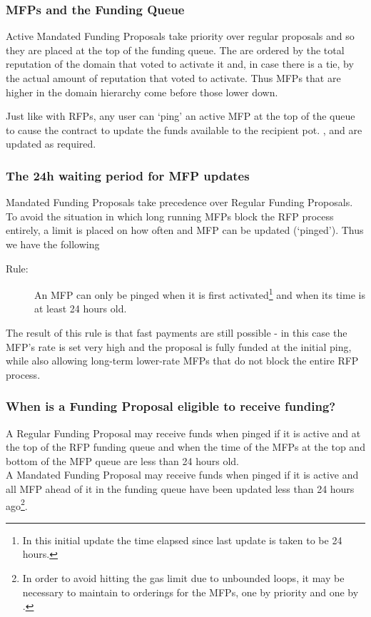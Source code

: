 \subsubsection*{MFPs and the Funding Queue}

Active Mandated Funding Proposals take priority over regular proposals and so they are placed at the top of the funding queue. The are ordered by the total reputation of the domain that voted to activate it and, in case there is a tie, by the actual amount of reputation that voted to activate. Thus MFPs that are higher in the domain hierarchy come before those lower down.

Just like with RFPs, any user can `ping' an active MFP at the top of the queue to cause the contract to update the funds available to the recipient pot. ,  and  are updated as required.

\subsubsection*{The 24h waiting period for MFP updates}
Mandated Funding Proposals take precedence over Regular Funding Proposals. To avoid the situation in which long running MFPs block the RFP process entirely, a limit is placed on how often and MFP can be updated (`pinged'). Thus we have the following
\begin{description}
 \item[Rule:] An MFP can only be pinged when it is first activated\footnote{In this initial update the time elapsed since last update is taken to be 24 hours.} and when its  time is at least 24 hours old.
\end{description}

The result of this rule is that fast payments are still possible - in this case the MFP's rate is set very high and the proposal is fully funded at the initial ping, while also allowing long-term lower-rate MFPs that do not block the entire RFP process.

\subsubsection*{When is a Funding Proposal eligible to receive funding?}
A Regular Funding Proposal may receive funds when pinged if it is active and at the top of the RFP funding queue and when the  time of the MFPs at the top and bottom of the MFP queue are less than 24 hours old.\\
A Mandated Funding Proposal may receive funds when pinged if it is active and all MFP ahead of it in the funding queue have been updated less than 24 hours ago\footnote{In order to avoid hitting the gas limit due to unbounded loops, it may be necessary to maintain to orderings for the MFPs, one by priority and one by .}.\\

